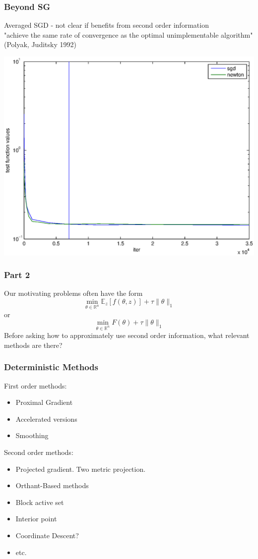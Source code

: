 \documentclass{beamer}
\begin{document}
	\begin{frame}
		\frametitle{Beyond SG}
		Averaged SGD - not clear if benefits from second order information\\
		"achieve the same rate of convergence as the optimal unimplementable algorithm" (Polyak, Juditsky 1992)
		\begin{center}
		\includegraphics[scale=0.4]{figures/P03.eps}
		\end{center}
	\end{frame}

	\begin{frame}
		\frametitle{Part 2}
		Our motivating problems often have the form 
		\[
			\min_{\theta \in \mathbb{R}^n}  \mathbb{E}_z[ f(\theta,z)] + \tau \|\theta\|_1
		\]
		or
		\[
			\min_{\theta \in \mathbb{R}^n}  F(\theta) + \tau \|\theta\|_1
		\]
		\pause
		Before asking how to approximately use second order information, what relevant methods are there?
	\end{frame}
	

	\begin{frame}
		\frametitle{Deterministic Methods}
		First order methods:
		\begin{itemize}
			\item Proximal Gradient
			\item Accelerated versions
			\item Smoothing  
		\end{itemize}
		\pause
		Second order methods:
		\begin{itemize}
			\item Projected gradient. Two metric projection.
			\item Orthant-Based methods
			\item Block active set 
			\item Interior point
			\item Coordinate Descent?
			\item etc.   
		\end{itemize}
	\end{frame}
\end{document}
